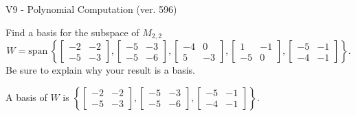 \begin{exercise}
  \begin{exerciseTitle}V9 - Polynomial Computation (ver. 596)\end{exerciseTitle}
  \begin{exerciseStatement}
    Find a basis for the subspace of \(M_{2,2}\) 
\[W=\mathrm{span}\ \left\{\left[\begin{array}{cc}
-2 & -2 \\
-5 & -3
\end{array}\right] , \left[\begin{array}{cc}
-5 & -3 \\
-5 & -6
\end{array}\right] , \left[\begin{array}{cc}
-4 & 0 \\
5 & -3
\end{array}\right] , \left[\begin{array}{cc}
1 & -1 \\
-5 & 0
\end{array}\right] , \left[\begin{array}{cc}
-5 & -1 \\
-4 & -1
\end{array}\right]\right\}.\]
 Be sure to explain why your result is a basis.


  \end{exerciseStatement}
  \begin{exerciseAnswer}
   A basis of \(W\) is  \(\left\{\left[\begin{array}{cc}
-2 & -2 \\
-5 & -3
\end{array}\right] , \left[\begin{array}{cc}
-5 & -3 \\
-5 & -6
\end{array}\right] , \left[\begin{array}{cc}
-5 & -1 \\
-4 & -1
\end{array}\right]\right\}\).
  


  \end{exerciseAnswer}
\end{exercise}